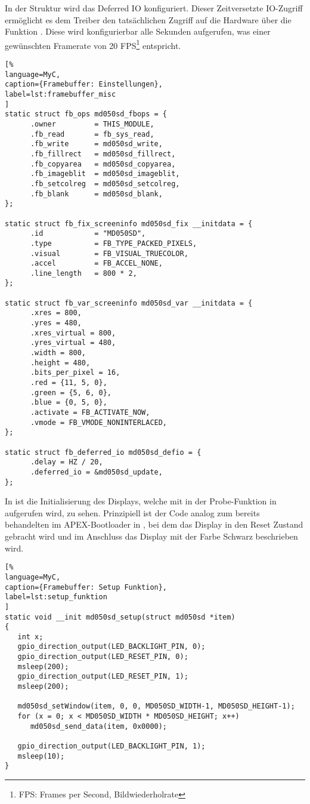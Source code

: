 In der Struktur  wird das Deferred IO konfiguriert. Dieser Zeitversetzte IO-Zugriff ermöglicht es dem Treiber den tatsächlichen Zugriff auf die Hardware über die Funktion . Diese wird konfigurierbar alle  Sekunden aufgerufen, was einer gewünschten Framerate von 20 FPS\footnote{FPS: Frames per Second, Bildwiederholrate} entspricht. 
\begin{lstlisting}[%
language=MyC,
caption={Framebuffer: Einstellungen},
label=lst:framebuffer_misc
]
static struct fb_ops md050sd_fbops = {
      .owner         = THIS_MODULE,
      .fb_read       = fb_sys_read,
      .fb_write      = md050sd_write,
      .fb_fillrect   = md050sd_fillrect,
      .fb_copyarea   = md050sd_copyarea,
      .fb_imageblit  = md050sd_imageblit,
      .fb_setcolreg  = md050sd_setcolreg,
      .fb_blank      = md050sd_blank,
};

static struct fb_fix_screeninfo md050sd_fix __initdata = {
      .id            = "MD050SD",
      .type          = FB_TYPE_PACKED_PIXELS,
      .visual        = FB_VISUAL_TRUECOLOR,
      .accel         = FB_ACCEL_NONE,
      .line_length   = 800 * 2,
};

static struct fb_var_screeninfo md050sd_var __initdata = {
      .xres = 800,
      .yres = 480,
      .xres_virtual = 800,
      .yres_virtual = 480,
      .width = 800,
      .height = 480,
      .bits_per_pixel = 16,
      .red = {11, 5, 0},
      .green = {5, 6, 0},
      .blue = {0, 5, 0},
      .activate = FB_ACTIVATE_NOW,
      .vmode = FB_VMODE_NONINTERLACED,
};

static struct fb_deferred_io md050sd_defio = {
      .delay = HZ / 20,
      .deferred_io = &md050sd_update,
};
\end{lstlisting}

In  ist die Initialisierung des Displays, welche mit  in der Probe-Funktion in  aufgerufen wird, zu sehen. Prinzipiell ist der Code analog zum bereits behandelten im APEX-Bootloader in , bei dem das Display in den Reset Zustand gebracht wird und im Anschluss das Display mit der Farbe Schwarz beschrieben wird.

\begin{lstlisting}[%
language=MyC,
caption={Framebuffer: Setup Funktion},
label=lst:setup_funktion
]
static void __init md050sd_setup(struct md050sd *item)
{
   int x;
   gpio_direction_output(LED_BACKLIGHT_PIN, 0);
   gpio_direction_output(LED_RESET_PIN, 0);
   msleep(200);
   gpio_direction_output(LED_RESET_PIN, 1);
   msleep(200);

   md050sd_setWindow(item, 0, 0, MD050SD_WIDTH-1, MD050SD_HEIGHT-1);
   for (x = 0; x < MD050SD_WIDTH * MD050SD_HEIGHT; x++)
      md050sd_send_data(item, 0x0000);

   gpio_direction_output(LED_BACKLIGHT_PIN, 1);
   msleep(10);
}
\end{lstlisting}

